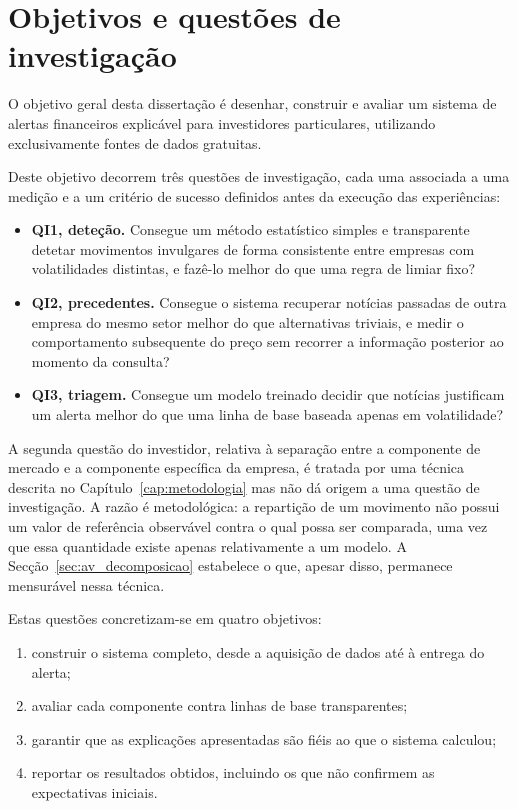 \section{Objetivos e questões de investigação}
\label{sec:intro_objetivos}

O objetivo geral desta dissertação é desenhar, construir e avaliar um sistema de alertas
financeiros explicável para investidores particulares, utilizando exclusivamente fontes de dados
gratuitas.

Deste objetivo decorrem três questões de investigação, cada uma associada a uma medição e a um
critério de sucesso definidos antes da execução das experiências:

\begin{itemize}
  \item \textbf{\gls{QI}1, deteção.} Consegue um método estatístico simples e transparente detetar
        movimentos invulgares de forma consistente entre empresas com volatilidades distintas, e
        fazê-lo melhor do que uma regra de limiar fixo?
  \item \textbf{\gls{QI}2, precedentes.} Consegue o sistema recuperar notícias passadas de outra
        empresa do mesmo setor melhor do que alternativas triviais, e medir o comportamento
        subsequente do preço sem recorrer a informação posterior ao momento da consulta?
  \item \textbf{\gls{QI}3, triagem.} Consegue um modelo treinado decidir que notícias justificam um
        alerta melhor do que uma linha de base baseada apenas em volatilidade?
\end{itemize}

A segunda questão do investidor, relativa à separação entre a componente de mercado e a componente
específica da empresa, é tratada por uma técnica descrita no Capítulo~\ref{cap:metodologia} mas não
dá origem a uma questão de investigação. A razão é metodológica: a repartição de um movimento não
possui um valor de referência observável contra o qual possa ser comparada, uma vez que essa
quantidade existe apenas relativamente a um modelo. A Secção~\ref{sec:av_decomposicao} estabelece
o que, apesar disso, permanece mensurável nessa técnica.

Estas questões concretizam-se em quatro objetivos:

\begin{enumerate}
  \item construir o sistema completo, desde a aquisição de dados até à entrega do alerta;
  \item avaliar cada componente contra linhas de base transparentes;
  \item garantir que as explicações apresentadas são fiéis ao que o sistema calculou;
  \item reportar os resultados obtidos, incluindo os que não confirmem as expectativas iniciais.
\end{enumerate}

